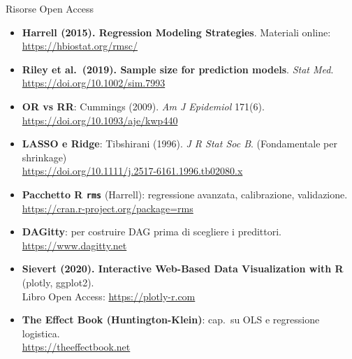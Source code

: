 \documentclass[
  ignorenonframetext,
]{beamer}
\begin{document}
\begin{frame}{Risorse Open Access}
\label{risorse-open-access}
\small

\begin{itemize}\footnotesize

\item \textbf{Harrell (2015). Regression Modeling Strategies}. Materiali online:\\
  \url{https://hbiostat.org/rmsc/}

\item \textbf{Riley et al.\ (2019). Sample size for prediction models}. \emph{Stat Med}.\\
  \url{https://doi.org/10.1002/sim.7993}

\item \textbf{OR vs RR}: Cummings (2009). \emph{Am J Epidemiol} 171(6).\\
  \url{https://doi.org/10.1093/aje/kwp440}

\item \textbf{LASSO e Ridge}: Tibshirani (1996). \emph{J R Stat Soc B}. (Fondamentale per shrinkage)\\
  \url{https://doi.org/10.1111/j.2517-6161.1996.tb02080.x}

\item \textbf{Pacchetto R \texttt{rms}} (Harrell): regressione avanzata, calibrazione, validazione.\\
  \url{https://cran.r-project.org/package=rms}

\item \textbf{DAGitty}: per costruire DAG prima di scegliere i predittori.\\
  \url{https://www.dagitty.net}

\item \textbf{Sievert (2020). Interactive Web-Based Data Visualization with R} (plotly, ggplot2).\\
  Libro Open Access: \url{https://plotly-r.com}

\item \textbf{The Effect Book (Huntington-Klein)}: cap.\ su OLS e regressione logistica.\\
  \url{https://theeffectbook.net}

\end{itemize}
\end{frame}
\end{document}
